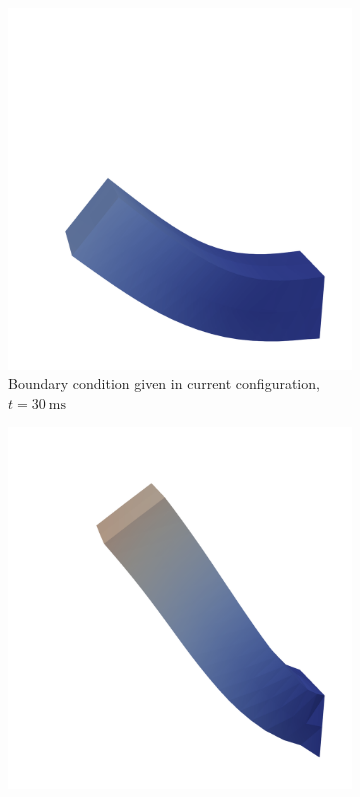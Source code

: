 \begin{figure}
\begin{subfigure}[t]{0.31\textwidth}
    \includegraphics[width=\textwidth]{images/implementation/current_configuration_2_cropped.png}
    \caption{Boundary condition given in current configuration, $t=\SI{30}{\milli\second}$}%
    \label{fig:current_configuration_2}%
  \end{subfigure}
  \quad
  \begin{subfigure}[t]{0.31\textwidth}%
    \centering%
    \includegraphics[width=\textwidth]{images/implementation/current_configuration_3_cropped.png}

\end{subfigure}
\end{figure}
